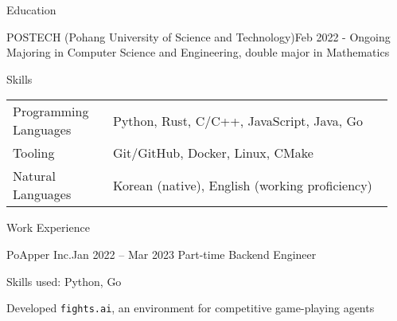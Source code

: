 \documentclass{resume}
\begin{document}
\begin{res-section}{Education}
  \begin{res-subsection}{POSTECH (Pohang University of Science and Technology)}{Feb 2022 - Ongoing}
    Majoring in Computer Science and Engineering, double major in Mathematics
  \end{res-subsection}
\end{res-section}

\begin{res-section}{Skills}
  \begin{tabular}{p{0.25\linewidth}p{0.7\linewidth}}
    Programming Languages
      & Python, Rust, C/C++, JavaScript, Java, Go \\
    Tooling
      & Git/GitHub, Docker, Linux, CMake \\
    Natural Languages
      & Korean (native), English (working proficiency)
  \end{tabular}
\end{res-section}

\begin{res-section}{Work Experience}
  \begin{res-subsection}{PoApper Inc.}{Jan 2022 -- Mar 2023}
    Part-time Backend Engineer

    \item Skills used: Python, Go

    \item Developed \texttt{fights.ai}, an environment for competitive game-playing agents
  \end{res-subsection}
\end{res-section}
\end{document}
